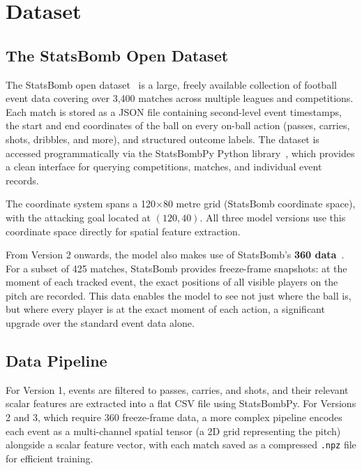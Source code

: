 \chapter{Dataset}\label{ch:dataset}

\section{The StatsBomb Open Dataset}

The StatsBomb open dataset~\cite{statsbomb2018} is a large, freely available collection of football event data covering over 3,400 matches across multiple leagues and competitions. Each match is stored as a JSON file containing second-level event timestamps, the start and end coordinates of the ball on every on-ball action (passes, carries, shots, dribbles, and more), and structured outcome labels. The dataset is accessed programmatically via the StatsBombPy Python library~\cite{statsbombpy}, which provides a clean interface for querying competitions, matches, and individual event records.

The coordinate system spans a 120$\times$80 metre grid (StatsBomb coordinate space), with the attacking goal located at $(120, 40)$. All three model versions use this coordinate space directly for spatial feature extraction.

From Version 2 onwards, the model also makes use of StatsBomb's \textbf{360 data}~\cite{statsbomb360}. For a subset of 425 matches, StatsBomb provides freeze-frame snapshots: at the moment of each tracked event, the exact positions of all visible players on the pitch are recorded. This data enables the model to see not just where the ball is, but where every player is at the exact moment of each action, a significant upgrade over the standard event data alone.

\section{Data Pipeline}\label{sec:pipeline}

For Version 1, events are filtered to passes, carries, and shots, and their relevant scalar features are extracted into a flat CSV file using StatsBombPy. For Versions 2 and 3, which require 360 freeze-frame data, a more complex pipeline encodes each event as a multi-channel spatial tensor (a 2D grid representing the pitch) alongside a scalar feature vector, with each match saved as a compressed \texttt{.npz} file for efficient training.


